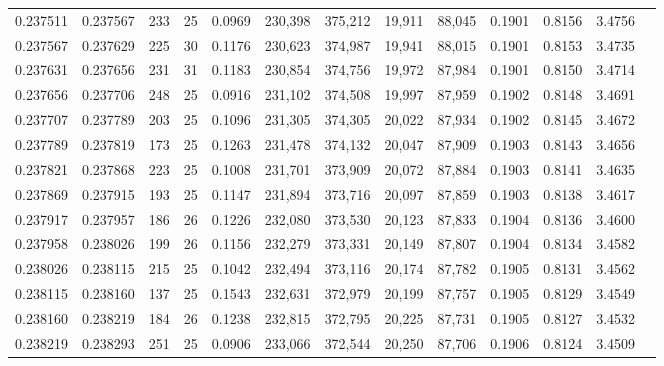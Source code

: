 \begin{tabular}{rrrrrrrrrrrrr}
0.237511 & 0.237567 &   233 &  25 &                                     0.0969 & 230,398 & 375,212 &  19,911 &  88,045 & 0.1901 & 0.8156 & 3.4756 \\
0.237567 & 0.237629 &   225 &  30 &                                     0.1176 & 230,623 & 374,987 &  19,941 &  88,015 & 0.1901 & 0.8153 & 3.4735 \\
0.237631 & 0.237656 &   231 &  31 &                                     0.1183 & 230,854 & 374,756 &  19,972 &  87,984 & 0.1901 & 0.8150 & 3.4714 \\
0.237656 & 0.237706 &   248 &  25 &                                     0.0916 & 231,102 & 374,508 &  19,997 &  87,959 & 0.1902 & 0.8148 & 3.4691 \\
0.237707 & 0.237789 &   203 &  25 &                                     0.1096 & 231,305 & 374,305 &  20,022 &  87,934 & 0.1902 & 0.8145 & 3.4672 \\
0.237789 & 0.237819 &   173 &  25 &                                     0.1263 & 231,478 & 374,132 &  20,047 &  87,909 & 0.1903 & 0.8143 & 3.4656 \\
0.237821 & 0.237868 &   223 &  25 &                                     0.1008 & 231,701 & 373,909 &  20,072 &  87,884 & 0.1903 & 0.8141 & 3.4635 \\
0.237869 & 0.237915 &   193 &  25 &                                     0.1147 & 231,894 & 373,716 &  20,097 &  87,859 & 0.1903 & 0.8138 & 3.4617 \\
0.237917 & 0.237957 &   186 &  26 &                                     0.1226 & 232,080 & 373,530 &  20,123 &  87,833 & 0.1904 & 0.8136 & 3.4600 \\
0.237958 & 0.238026 &   199 &  26 &                                     0.1156 & 232,279 & 373,331 &  20,149 &  87,807 & 0.1904 & 0.8134 & 3.4582 \\
0.238026 & 0.238115 &   215 &  25 &                                     0.1042 & 232,494 & 373,116 &  20,174 &  87,782 & 0.1905 & 0.8131 & 3.4562 \\
0.238115 & 0.238160 &   137 &  25 &                                     0.1543 & 232,631 & 372,979 &  20,199 &  87,757 & 0.1905 & 0.8129 & 3.4549 \\
0.238160 & 0.238219 &   184 &  26 &                                     0.1238 & 232,815 & 372,795 &  20,225 &  87,731 & 0.1905 & 0.8127 & 3.4532 \\
0.238219 & 0.238293 &   251 &  25 &                                     0.0906 & 233,066 & 372,544 &  20,250 &  87,706 & 0.1906 & 0.8124 & 3.4509 \\

\end{tabular}
